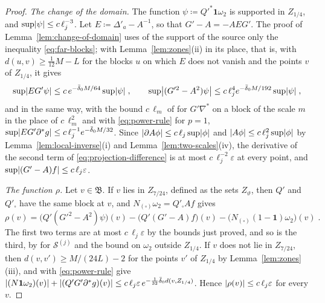 \documentclass[11pt]{preprint}
\DeclarePairedDelimiter{\abs}{\lvert}{\rvert}
\numberwithin{equation}{section}
\theoremstyle{definition}
\theoremstyle{remark}
\theoremstyle{plain}
\begin{document}
\begin{proof}
\emph{The change of the domain.} The function $\psi \coloneqq Q'^*\mathbf 1\omega_2$ is supported in $Z_{1/4}$, and $\sup\abs\psi \leq c\,\ell_j^{-3}$. Let $E \coloneqq \Delta'_a - A^{-1}$, so that $G' - A = -AEG'$. The proof of Lemma~\ref{lem:change-of-domain} uses of the support of the source only the inequality \eqref{eq:far-blocks}; with Lemma~\ref{lem:zones}(ii) in its place, that is, with $d(u, v) \geq \frac{1}{12}M - L$ for the blocks $u$ on which $E$ does not vanish and the points $v$ of $Z_{1/4}$, it gives
\begin{equation}\label{eq:change-of-domain-zone}
    \sup\abs{EG'\psi} \leq c\,e^{-\bar\delta_0M/64}\sup\abs\psi\;,
    \qquad
    \sup\bigl\lvert(G'^2 - A^2)\psi\bigr\rvert \leq c\,\ell_j^4e^{-\bar\delta_0M/192}\sup\abs\psi\;,
\end{equation}
and in the same way, with the bound $c\,\ell_m$ of \cite[(2.67)]{BalabanPRT2} for $G'\nabla^*$ on a block of the scale $m$ in the place of $c\,\ell_m^2$ and with \eqref{eq:power-rule} for $p = 1$, $\sup\abs{EG'\partial^*g} \leq c\,\ell_j^{-1}e^{-\bar\delta_0M/32}$. Since $\abs{\partial A\phi} \leq c\,\ell_j\sup\abs\phi$ and $\abs{A\phi} \leq c\,\ell_j^2\sup\abs\phi$ by Lemma~\ref{lem:local-inverse}(i) and Lemma~\ref{lem:two-scales}(iv), the derivative of the second term of \eqref{eq:projection-difference} is at most $c\,\ell_j^{-2}\varepsilon$ at every point, and $\sup\abs{(G' - A)f} \leq c\,\ell_j\varepsilon$.

\emph{The function $\rho$.} Let $v \in \mathfrak B$. If $v$ lies in $Z_{7/24}$, defined as the sets $Z_\vartheta$, then $Q'$ and $Q'_\square$ have the same block at $v$, and $N_{(\square)}\omega_2 = Q'_\square Af$ gives
\begin{equation}\label{eq:rho-inner}
    \rho(v) = \bigl(Q'(G'^2 - A^2)\psi\bigr)(v) - \bigl(Q'(G' - A)f\bigr)(v) - \bigl(N_{(\square)}(1 - \mathbf 1)\omega_2\bigr)(v)\;.
\end{equation}
The first two terms are at most $c\,\ell_j\varepsilon$ by the bounds just proved, and so is the third, by \cite[(2.68)]{BalabanPRT2} for $\mathcal S^{(j)}$ and the bound on $\omega_2$ outside $Z_{1/4}$. If $v$ does not lie in $Z_{7/24}$, then $d(v, v') \geq M/(24L) - 2$ for the points $v'$ of $Z_{1/4}$ by Lemma~\ref{lem:zones}(iii), and \cite[(2.68), (2.67)]{BalabanPRT2} with \eqref{eq:power-rule} give $\abs{(N\mathbf 1\omega_2)(v)} + \abs{(Q'G'\partial^*g)(v)} \leq c\,\ell_j\varepsilon\,e^{-\frac{1}{32}\bar\delta_0d(v, Z_{1/4})}$. Hence $\abs{\rho(v)} \leq c\,\ell_j\varepsilon$ for every $v$.


\end{proof}
\end{document}
